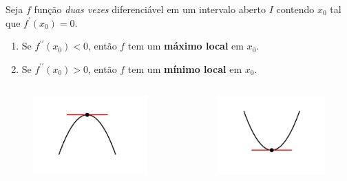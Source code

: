 \begin{frame}
  \begin{theorem}
    Seja $f$ função \emph{duas vezes} diferenciável em um intervalo aberto $I$ contendo $x_{0}$ tal que \mbox{$f^{\prime}(x_{0}) = 0$}.
    \begin{enumerate}
      \item Se $f^{\prime\prime}(x_{0}) < 0$, então $f$ tem um \textbf{máximo local} em $x_{0}$.
      \item Se $f^{\prime\prime}(x_{0}) > 0$, então $f$ tem um \textbf{mínimo local} em $x_{0}$.
    \end{enumerate}
  \end{theorem}
  \begin{columns}[onlytextwidth]
    \begin{column}{0.45\textwidth}\vspace{-0.9cm}
      \begin{figure}
        \includegraphics[width=\textwidth]{figuras/fig6.pdf}
      \end{figure}
    \end{column}
    \begin{column}{0.45\textwidth}\vspace{-0.9cm}
      \begin{figure}
        \includegraphics[width=\textwidth]{figuras/fig7.pdf}

\end{figure}
\end{column}
\end{columns}
\end{frame}
